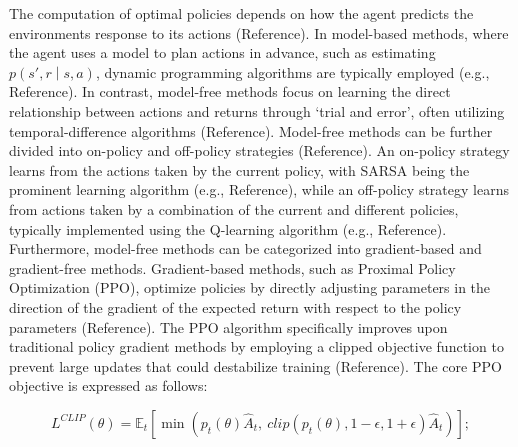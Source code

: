The computation of optimal policies depends on how the agent predicts
the environment\textquotesingle s response to its actions
(\colorbox{yellow!40}{Reference}). In model-based methods, where the agent uses a model
to plan actions in advance, such as estimating
\(p\left( s',r \middle| s,a \right)\), dynamic programming algorithms
are typically employed (\colorbox{yellow!40}{e.g., Reference}). In contrast, model-free
methods focus on learning the direct relationship between actions and
returns through `trial and error', often utilizing temporal-difference
algorithms (\colorbox{yellow!40}{Reference}). Model-free methods can be further divided
into on-policy and off-policy strategies (\colorbox{yellow!40}{Reference}). An on-policy
strategy learns from the actions taken by the current policy, with SARSA
being the prominent learning algorithm (\colorbox{yellow!40}{e.g., Reference}), while an
off-policy strategy learns from actions taken by a combination of the
current and different policies, typically implemented using the
Q-learning algorithm (\colorbox{yellow!40}{e.g., Reference}). Furthermore, model-free
methods can be categorized into gradient-based and gradient-free
methods. Gradient-based methods, such as Proximal Policy Optimization
(PPO), optimize policies by directly adjusting parameters in the
direction of the gradient of the expected return with respect to the
policy parameters (\colorbox{yellow!40}{Reference}). The PPO algorithm specifically
improves upon traditional policy gradient methods by employing a clipped
objective function to prevent large updates that could destabilize
training (\colorbox{yellow!40}{Reference}). The core PPO objective is expressed as
follows:

\begin{equation}
L^{CLIP}(\theta) = \mathbb{E}_{t}\left\lbrack \min\left( p_{t}(\theta){\widehat{A}}_{t},\ clip(p_{t}(\theta),1 - \epsilon,1 + \epsilon){\widehat{A}}_{t} \right) \right\rbrack;
\tag{7}
\end{equation}


